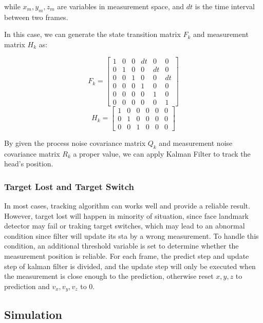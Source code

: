 while $x_m, y_m, z_m$ are variables in measurement space, and $dt$ is the time interval between two frames. 

In this case, we can generate the state transition matrix $F_k$ and measurement matrix $H_k$ as:

$$    
F_k = \begin{bmatrix} 1 & 0 & 0 & dt & 0 & 0 \\ 0 & 1 & 0 & 0 & dt & 0 \\ 0 & 0 & 1 & 0 & 0 & dt \\ 0 & 0 & 0 & 1 & 0 & 0 \\ 0 & 0 & 0 & 0 & 1 & 0 \\ 0 & 0 & 0 & 0 & 0 & 1 \end{bmatrix} 
$$
$$
H_k = \begin{bmatrix} 1 & 0 & 0 & 0 & 0 & 0 \\ 0 & 1 & 0 & 0 & 0 & 0 \\ 0 & 0 & 1 & 0 & 0 & 0 \end{bmatrix}
$$

By given the process noise covariance matrix $Q_k$ and measurement noise covariance matrix $R_k$ a proper value, we can apply Kalman Filter to track the head's position.

\subsubsection{Target Lost and Target Switch}
In most cases, tracking algorithm can works well and provide a reliable result. However, target lost will happen in minority of situation, since face landmark detector may fail or traking target switches, which may lead to an abnormal condition since filter will update its sta by a wrong measurement. To handle this condition, an additional threshold variable is set to determine whether the measurement position is reliable. For each frame, the predict step and update step of kalman filter is divided, and the update step will only be executed when the measurement is close enough to the prediction, otherwise reset $x,y,z$ to prediction and $v_x,v_y,v_z$ to 0.


\subsection{Simulation}

